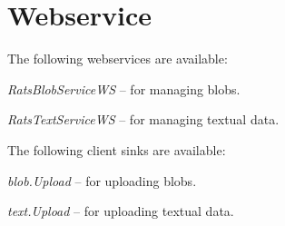\documentclass[a4paper]{book}
\begin{document}
\section{Webservice}
The following webservices are available:
\begin{tight_itemize}
  \item \textit{RatsBlobServiceWS} -- for managing blobs.
  \item \textit{RatsTextServiceWS} -- for managing textual data.
\end{tight_itemize}
The following client sinks are available:
\begin{tight_itemize}
  \item \textit{blob.Upload} -- for uploading blobs.
  \item \textit{text.Upload} -- for uploading textual data.
\end{tight_itemize}



\end{document}
